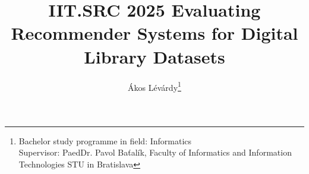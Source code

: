 \documentclass{llncs}
\begin{document}
%
\title{IIT.SRC 2025 Evaluating Recommender Systems for Digital Library Datasets}
%
%
\author{Ákos Lévárdy\thanks{Bachelor study programme in field: Informatics \\Supervisor: PaedDr. Pavol Baťalík, Faculty of Informatics and Information Technologies STU in Bratislava }}%
%
%
%
\maketitle              %
%
\end{document}
